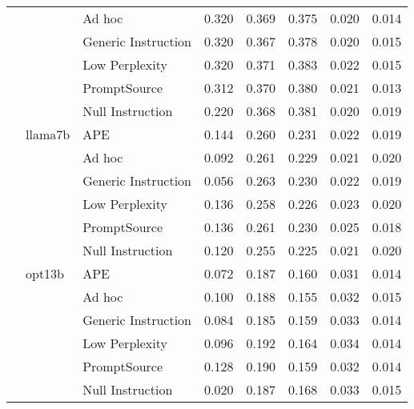 \begin{supertabular}{lllrrrrr}
              &        & Ad hoc &            0.320 &           0.369 &          0.375 &        0.020 &    0.014 \\
              &        & Generic Instruction &            0.320 &           0.367 &          0.378 &        0.020 &    0.015 \\
              &        & Low Perplexity &            0.320 &           0.371 &          0.383 &        0.022 &    0.015 \\
              &        & PromptSource &            0.312 &           0.370 &          0.380 &        0.021 &    0.013 \\
              &        & Null Instruction &            0.220 &           0.368 &          0.381 &        0.020 &    0.019 \\
              & llama7b & APE &            0.144 &           0.260 &          0.231 &        0.022 &    0.019 \\
              &        & Ad hoc &            0.092 &           0.261 &          0.229 &        0.021 &    0.020 \\
              &        & Generic Instruction &            0.056 &           0.263 &          0.230 &        0.022 &    0.019 \\
              &        & Low Perplexity &            0.136 &           0.258 &          0.226 &        0.023 &    0.020 \\
              &        & PromptSource &            0.136 &           0.261 &          0.230 &        0.025 &    0.018 \\
              &        & Null Instruction &            0.120 &           0.255 &          0.225 &        0.021 &    0.020 \\
              & opt13b & APE &            0.072 &           0.187 &          0.160 &        0.031 &    0.014 \\
              &        & Ad hoc &            0.100 &           0.188 &          0.155 &        0.032 &    0.015 \\
              &        & Generic Instruction &            0.084 &           0.185 &          0.159 &        0.033 &    0.014 \\
              &        & Low Perplexity &            0.096 &           0.192 &          0.164 &        0.034 &    0.014 \\
              &        & PromptSource &            0.128 &           0.190 &          0.159 &        0.032 &    0.014 \\
              &        & Null Instruction &            0.020 &           0.187 &          0.168 &        0.033 &    0.015 \\

\end{supertabular}

